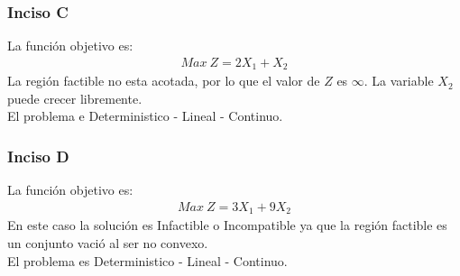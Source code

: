 \documentclass{tarea}
\begin{document}
\begin{homeworkProblem}
\subsubsection{Inciso C}
La función objetivo es:
\begin{align*}
	Max\ Z = 2X_1 + X_2
\end{align*}
La región factible no esta acotada, por lo que el valor de $Z$ es $\infty$. La variable $X_2$ puede crecer libremente. \\
El problema e Deterministico - Lineal - Continuo.

\subsubsection{Inciso D}
La función objetivo es: 
\begin{align*}
	Max\ Z = 3X_1 + 9X_2
\end{align*}
En este caso la solución es Infactible o Incompatible ya que la región factible es un conjunto vació al ser no convexo. \\
El problema es Deterministico - Lineal - Continuo.
\end{homeworkProblem}
\end{document}

